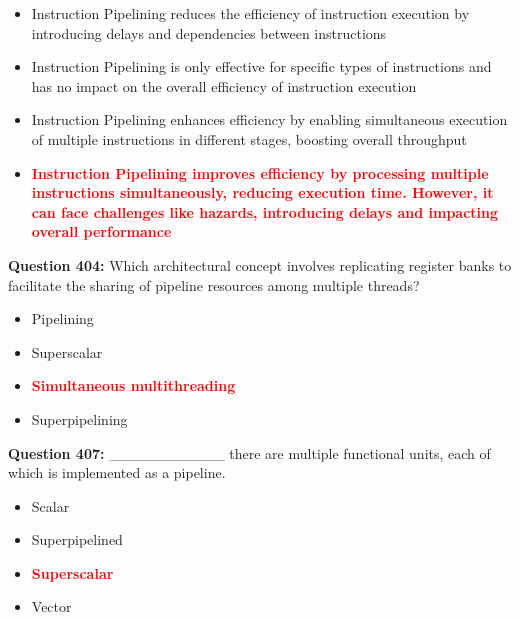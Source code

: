 \documentclass[12pt,a4paper]{article}
\begin{document}
\begin{itemize}
    \item[\textbf{A.}] Instruction Pipelining reduces the efficiency of instruction execution by introducing delays and dependencies between instructions
    \item[\textbf{B.}] Instruction Pipelining is only effective for specific types of instructions and has no impact on the overall efficiency of instruction execution
    \item[\textbf{C.}] Instruction Pipelining enhances efficiency by enabling simultaneous execution of multiple instructions in different stages, boosting overall throughput
    \item[\textbf{D.}] \textcolor{red}{\textbf{Instruction Pipelining improves efficiency by processing multiple instructions simultaneously, reducing execution time. However, it can face challenges like hazards, introducing delays and impacting overall performance}}
\end{itemize}

\vspace{0.5cm}

\textbf{Question 404:} Which architectural concept involves replicating register banks to facilitate the sharing of pipeline resources among multiple threads?

\begin{itemize}
    \item[\textbf{A.}] Pipelining
    \item[\textbf{B.}] Superscalar
    \item[\textbf{C.}] \textcolor{red}{\textbf{Simultaneous multithreading}}
    \item[\textbf{D.}] Superpipelining
\end{itemize}

\vspace{0.5cm}

\textbf{Question 407:} ___________ there are multiple functional units, each of which is implemented as a pipeline.

\begin{itemize}
    \item[\textbf{A.}] Scalar
    \item[\textbf{B.}] Superpipelined
    \item[\textbf{C.}] \textcolor{red}{\textbf{Superscalar}}
    \item[\textbf{D.}] Vector
\end{itemize}

\vspace{0.5cm}
\end{document}
